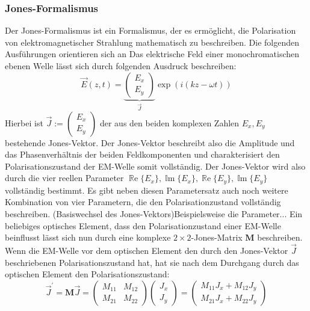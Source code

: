 \documentclass[titlepage,  ngerman]{article}
\renewcommand{\Re}{\operatorname{\mathbb{R}e}}
\renewcommand{\Im}{\operatorname{\mathbb{I}m}}
\begin{document}
	\subsubsection{Jones-Formalismus}
	Der Jones-Formalismus ist ein Formalismus, der es ermöglicht, die Polarisation von elektromagnetischer Strahlung mathematisch zu beschreiben. Die folgenden Ausführungen orientieren sich an \cite{Hecht.2018} Das elektrische Feld einer monochromatischen ebenen Welle lässt sich durch folgenden Ausdruck beschreiben:
	\begin{equation}
		\vec{E}(z, t) = \underbrace{\begin{pmatrix}E_x \\ E_y\end{pmatrix}}_{\vec{J}} \exp(i(kz-\omega t))
	\end{equation}
	Hierbei ist $\vec{J} := \begin{pmatrix}E_x \\ E_y\end{pmatrix}$ der aus den beiden komplexen Zahlen $E_x, E_y$ bestehende Jones-Vektor. Der Jones-Vektor beschreibt also die Amplitude und das Phasenverhältnis der beiden Feldkomponenten und charakterisiert den Polarisationszustand der EM-Welle somit vollständig. Der Jones-Vektor wird also durch die vier reellen Parameter $\Re\{E_x\}, \Im\{E_x\}, \Re\{E_y\}, \Im\{E_y\}$ vollständig bestimmt. Es gibt neben diesen Parametersatz auch noch weitere Kombination von vier Parametern, die den Polarisationzustand vollständig beschreiben. (Basiswechsel des Jones-Vektors)Beispielsweise die Parameter...
	Ein beliebiges optisches Element, dass den Polarisationzustand einer EM-Welle beinflusst lässt sich nun durch eine komplexe $2 \times 2$-Jones-Matrix $\boldsymbol{M}$ beschreiben. Wenn die EM-Welle vor dem optischen Element den durch den Jones-Vektor $\vec{J}$ beschriebenen Polarisationszustand hat, hat sie nach dem Durchgang durch das optischen Element den Polarisationszustand:
	\begin{equation}
		\vec{J}^\prime = \boldsymbol{M} \vec{J}  =  
		\begin{pmatrix}
			M_{11} & M_{12} \\
			M_{21} & M_{22}
		\end{pmatrix}
		\begin{pmatrix}
			J_x \\
			J_y
		\end{pmatrix} = 
		\begin{pmatrix}
			M_{11} J_x + M_{12} J_y \\
			M_{21} J_x + M_{22} J_y
		\end{pmatrix}		
	\end{equation}
\end{document}
